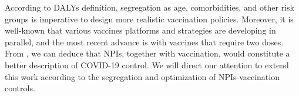 According to DALYs definition, segregation as age, comorbidities, and other
risk groups is imperative to design more realistic vaccination policies.
Moreover, it is well-known that various vaccines platforms and strategies are
developing in parallel, and the most recent advance is with vaccines that
require two doses. From \cite{Perkins2020}, we can deduce that NPIs, together
with
vaccination, would constitute a better description of COVID-19 control. We will
direct our attention to extend this work according to the segregation and
optimization of NPIs-vaccination controls.


